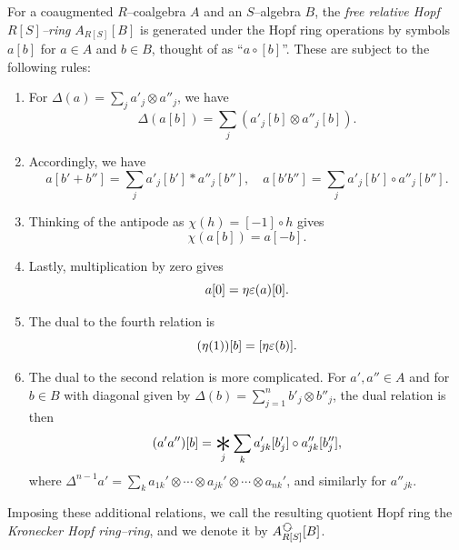 \begin{definition}\label{DefnAlgebraicModelOfCoopns}
For a coaugmented \(R\)--coalgebra \(A\) and an \(S\)--algebra \(B\), the \textit{free relative Hopf \(R[S]\)--ring} \(A_{R[S]}[B]\) is generated under the Hopf ring operations by symbols \(a[b]\) for \(a \in A\) and \(b \in B\), thought of as ``\(a \circ [b]\)''.
These are subject to the following rules:
\begin{enumerate}
    \item For \(\Delta(a) = \sum_j a'_j \otimes a''_j\), we have \[\Delta(a[b]) = \sum_j (a'_j[b] \otimes a''_j[b]).\]
    \item Accordingly, we have \[a [b' + b''] = \sum_j a'_j[b'] \ast a''_j[b''], \quad a [b' b''] = \sum_j a'_j[b'] \circ a''_j[b''].\]
    \item Thinking of the antipode as \(\chi(h) = [-1] \circ h\) gives \[\chi(a[b]) = a[-b].\]
    \item Lastly, multiplication by zero gives \[a[0] = \eta\varepsilon(a)[0].\]
    \item The dual to the fourth relation is \[(\eta(1))[b] = [\eta\varepsilon(b)].\]
    \item The dual to the second relation is more complicated.
          For \(a', a'' \in A\) and for \(b \in B\) with diagonal given by \(\Delta(b) = \sum_{j=1}^n b'_j \otimes b''_j\), the dual relation is then \[(a'a'')[b] = \bigast_j \sum_k a_{jk}'[b'_j] \circ a_{jk}''[b''_j],\] where \(\Delta^{n-1} a' = \sum_k a_{1k}' \otimes \cdots \otimes a_{jk}' \otimes \cdots \otimes a_{nk}'\), and similarly for \(a''_{jk}\).
\end{enumerate}
Imposing these additional relations, we call the resulting quotient Hopf ring the \textit{Kronecker Hopf ring--ring}, and we denote it by \(A_{R[S]}^{\circulatearrows}[B]\).
\end{definition}

